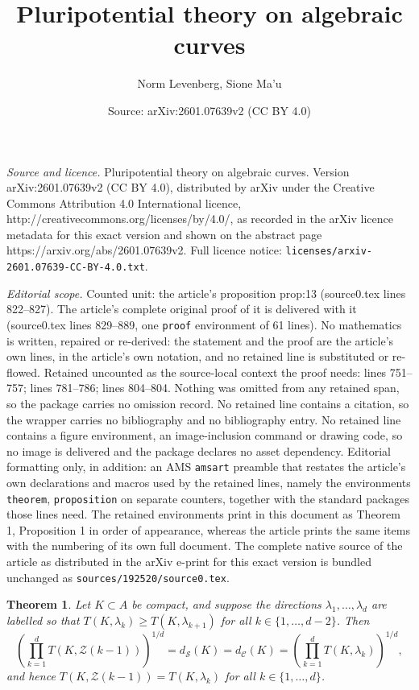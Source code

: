 \documentclass[10pt,a4paper]{amsart}
\title{Pluripotential theory on algebraic curves}
\author{Norm Levenberg, Sione Ma'u}
\date{Source: arXiv:2601.07639v2 (CC BY 4.0)}
\newtheorem{theorem}{Theorem}
\newcommand{\calC}{\mathcal{C}}
\newcommand{\calS}{\mathcal{S}}
\newcommand{\calZ}{\mathcal{Z}}
\begin{document}
\maketitle

\noindent\emph{Source and licence.} Pluripotential theory on algebraic curves. Version arXiv:2601.07639v2 (CC BY 4.0), distributed by arXiv under the Creative Commons Attribution 4.0 International licence, http://creativecommons.org/licenses/by/4.0/, as recorded in the arXiv licence metadata for this exact version and shown on the abstract page https://arxiv.org/abs/2601.07639v2. Full licence notice: \texttt{licenses/arxiv-2601.07639-CC-BY-4.0.txt}.\par\smallskip

\noindent\textit{Editorial scope.} Counted unit: the article's proposition prop:13 (source0.tex lines 822--827). The article's complete original proof of it is delivered with it (source0.tex lines 829--889, one \texttt{proof} environment of 61 lines). No mathematics is written, repaired or re-derived: the statement and the proof are the article's own lines, in the article's own notation, and no retained line is substituted or re-flowed.  Retained uncounted as the source-local context the proof needs: lines 751--757; lines 781--786; lines 804--804.  Nothing was omitted from any retained span, so the package carries no omission record.  No retained line contains a citation, so the wrapper carries no bibliography and no bibliography entry.  No retained line contains a figure environment, an image-inclusion command or drawing code, so no image is delivered and the package declares no asset dependency.  Editorial formatting only, in addition: an AMS \texttt{amsart} preamble that restates the article's own declarations and macros used by the retained lines, namely the environments \texttt{theorem}, \texttt{proposition} on separate counters, together with the standard packages those lines need.  The retained environments print in this document as Theorem 1, Proposition 1 in order of appearance, whereas the article prints the same items with the numbering of its own full document.  The complete native source of the article as distributed in the arXiv e-print for this exact version is bundled unchanged as \texttt{sources/192520/source0.tex}.
\begin{theorem}\label{thm:ds=dc}
Let $K\subset A$ be compact, and suppose the directions $\lambda_1,\ldots,\lambda_d$ are labelled so that $T(K,\lambda_k)\geq T(K,\lambda_{k+1})$ for all $k\in\{1,\ldots, d-2\}$.  Then 
\begin{equation}\label{eqn:ds=dc}
\left(\prod_{k=1}^d  T(K,\calZ(k-1))\right)^{1/d} =  d_{\calS}(K) = d_{\calC}(K) = \left(\prod_{k=1}^d T(K,\lambda_k)\right)^{1/d},
\end{equation}
and hence $T(K,\calZ(k-1))=T(K,\lambda_k)$ for all $k\in\{1,\ldots,d\}$.
\end{theorem}
\end{document}
